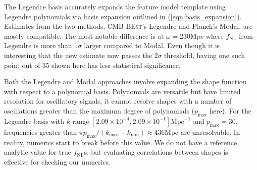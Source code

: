 The Legendre basis accurately expands the feature model template using Legendre polynomials via basis expansion outlined in (\ref{eqn:basis_expansion}). Estimates from the two methods, \textsc{CMB-BEst}'s Legendre and Planck's Modal, are mostly compatible. The most notable difference is at $\omega=230$Mpc where $f_\text{NL}$ from Legendre is more than $1\sigma$ larger compared to Modal. Even though it is interesting that the new estimate now passes the $2\sigma$ threshold, having one such point out of 35 shown here has less statistical significance.

Both the Legendre and Modal approaches involve expanding the shape function with respect to a polynomial basis. Polynomials are versatile but have limited resolution for oscillatory signals; it cannot resolve shapes with a number of oscillations greater than the maximum degree of polynomials ($p_\text{max}$ here). For the Legendre basis with $k$ range $[2.09\times 10^{-4}, 2.09\times 10^{-1}]\text{Mpc}^{-1}$ and $p_\text{max}=30$, frequencies greater than $\pi p_\text{max} / (k_\text{max} - k_\text{min}) \approx 436$Mpc are unresolvable. In reality, numerics start to break before this value. We do not have a reference analytic value for true $f_\text{NL}$s, but evaluating correlations between shapes is effective for checking our numerics.

